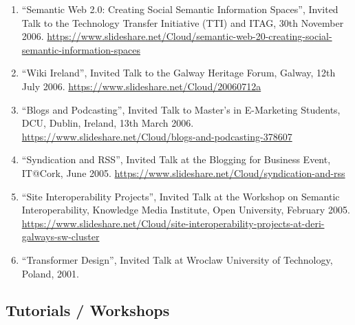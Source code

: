 \documentclass[10pt,a4paper]{res} %
\begin{document}
\begin{resume}
\begin{enumerate}
\item ``Semantic Web 2.0: Creating Social Semantic Information Spaces'', Invited Talk to the Technology Transfer Initiative (TTI) and ITAG, 30th November 2006. \url{https://www.slideshare.net/Cloud/semantic-web-20-creating-social-semantic-information-spaces}
\item ``Wiki Ireland'', Invited Talk to the Galway Heritage Forum, Galway, 12th July 2006. \url{https://www.slideshare.net/Cloud/20060712a}
\item ``Blogs and Podcasting'', Invited Talk to Master's in E-Marketing Students, DCU, Dublin, Ireland, 13th March 2006. \url{https://www.slideshare.net/Cloud/blogs-and-podcasting-378607}
\item ``Syndication and RSS'', Invited Talk at the Blogging for Business Event, IT@Cork, June 2005. \url{https://www.slideshare.net/Cloud/syndication-and-rss}
\item ``Site Interoperability Projects'', Invited Talk at the Workshop on Semantic Interoperability, Knowledge Media Institute, Open University, February 2005. \url{https://www.slideshare.net/Cloud/site-interoperability-projects-at-deri-galways-sw-cluster}
\item ``Transformer Design'', Invited Talk at Wroclaw University of Technology, Poland, 2001. %
\end{enumerate}

\subsection*{Tutorials / Workshops}


\end{resume}
\end{document}
